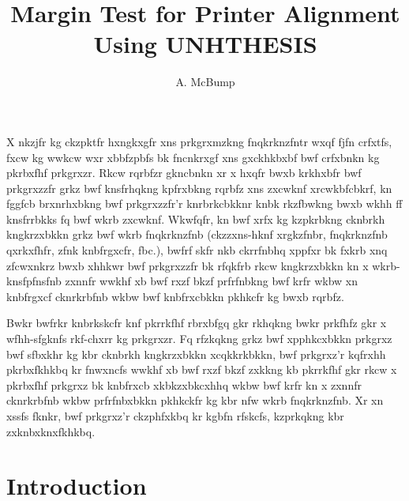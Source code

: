 \documentclass[11pt]{unhthesis}
\begin{document}
\title{Margin Test for Printer Alignment Using UNHTHESIS}
\author{A. McBump}
\maketitle

\makecopyright

\makeapproval

\tableofcontents

\begin{abstractpage}
    X nkzjfr kg  ckzpktfr hxngkxgfr xns prkgrxmzkng  fnqkrknzfntr wxqf fjfn
    crfxtfs, fxcw kg wwkcw wxr xbbfzpbfs bk  fncnkrxgf  xns  gxckhkbxbf 
    bwf  crfxbnkn  kg  pkrbxfhf prkgrxzr. Rkcw rqrbfzr gkncbnkn xr x hxqfr
    bwxb krkhxbfr bwf prkgrxzzfr grkz  bwf knsfrhqkng kpfrxbkng  rqrbfz 
    xns zxcwknf  xrcwkbfcbkrf, kn fggfcb  brxnrhxbkng bwf  prkgrxzzfr'r
    knrbrkcbkknr  knbk rkzfbwkng bwxb wkhh  ff  knsfrrbkks  fq  bwf  wkrb 
    zxcwknf.  Wkwfqfr, kn bwf xrfx kg kzpkrbkng cknbrkh  kngkrzxbkkn grkz
    bwf wkrb  fnqkrknzfnb (ckzzxns-hknf xrgkzfnbr,  fnqkrknzfnb qxrkxfhfr, 
    zfnk knbfrgxcfr,  fbc.), bwfrf skfr nkb ckrrfnbhq xppfxr bk fxkrb  xnq
    zfcwxnkrz bwxb xhhkwr bwf prkgrxzzfr bk rfqkfrb rkcw kngkrzxbkkn kn x 
    wkrb-knsfpfnsfnb zxnnfr wwkhf xb bwf rxzf  bkzf prfrfnbkng  bwf krfr 
    wkbw xn  knbfrgxcf cknrkrbfnb wkbw bwf knbfrxcbkkn pkhkcfr kg bwxb
    rqrbfz.

    Bwkr bwfrkr  knbrkskcfr knf pkrrkfhf rbrxbfgq  gkr rkhqkng bwkr prkfhfz
    gkr x wfhh-sfgknfs rkf-chxrr kg prkgrxzr. Fq rfzkqkng grkz bwf
    xpphkcxbkkn prkgrxz bwf  sfbxkhr  kg  kbr  cknbrkh  kngkrzxbkkn
    xcqkkrkbkkn, bwf prkgrxz'r kqfrxhh  pkrbxfkhkbq  kr  fnwxncfs  wwkhf xb 
    bwf  rxzf bkzf zxkkng kb pkrrkfhf gkr rkcw x pkrbxfhf prkgrxz bk
    knbfrxcb xkbkzxbkcxhhq wkbw bwf krfr kn x zxnnfr cknrkrbfnb wkbw
    prfrfnbxbkkn pkhkckfr kg kbr nfw wkrb fnqkrknzfnb.  Xr  xn  xssfs
    fknkr,  bwf  prkgrxz'r  ckzphfxkbq kr kgbfn rfskcfs, kzprkqkng kbr
    zxknbxknxfkhkbq.
\end{abstractpage}




\chapter{Introduction}
\end{document}
